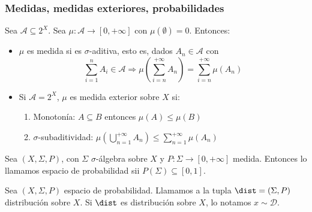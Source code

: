 \begin{frame}\frametitle{Medidas, medidas exteriores, probabilidades}
 \begin{definition}
  Sea $\mathcal{A} \subseteq 2^X$. Sea $\mu: \mathcal{A} \rightarrow [0, +\infty]$ con $\mu(\emptyset) = 0$. Entonces:
  
  \begin{itemize}
   \item $\mu$ es medida si es $\sigma$-aditiva, esto es, dados $A_n \in \mathcal{A}$ con 
   \[
    \sum_{i=1}^n A_i \in \mathcal{A} \Rightarrow \mu\left(\sum_{i=n}^{+\infty} A_n \right)= \sum_{i=n}^{+\infty} \mu(A_n)
   \]
  
   \item Si $\mathcal{A}=2^X$, $\mu$ es medida exterior sobre $X$ si:
  
    \begin{enumerate}[i]
     \item Monotonía: $A\subseteq B$ entonces $\mu(A) \le \mu(B)$
     \item $\sigma$-subaditividad: $\mu \left(\bigcup_{n=1}^{+\infty} A_n \right) \le \sum_{n=1}^{+\infty} \mu (A_n)$
    \end{enumerate}
  \end{itemize}
 \end{definition}

 \vspace{-1em}
 \begin{definition}
  Sea $(X, \Sigma, P)$, con $\Sigma$ $\sigma$-álgebra sobre $X$ y $P:\Sigma \rightarrow [0, +\infty]$ medida. 
  Entonces lo llamamos espacio de probabilidad sii $P(\Sigma)\subseteq [0,1]$.
 \end{definition}
 
 \begin{definition}
  Sea $(X, \Sigma, P)$ espacio de probabilidad. Llamamos a la tupla $\dist = (\Sigma,P)$ distribución sobre $X$. 
  Si $\dist$ es distribución sobre $X$, lo notamos $x\sim \mathcal{D}$.
 \end{definition}
 \end{frame}
 
